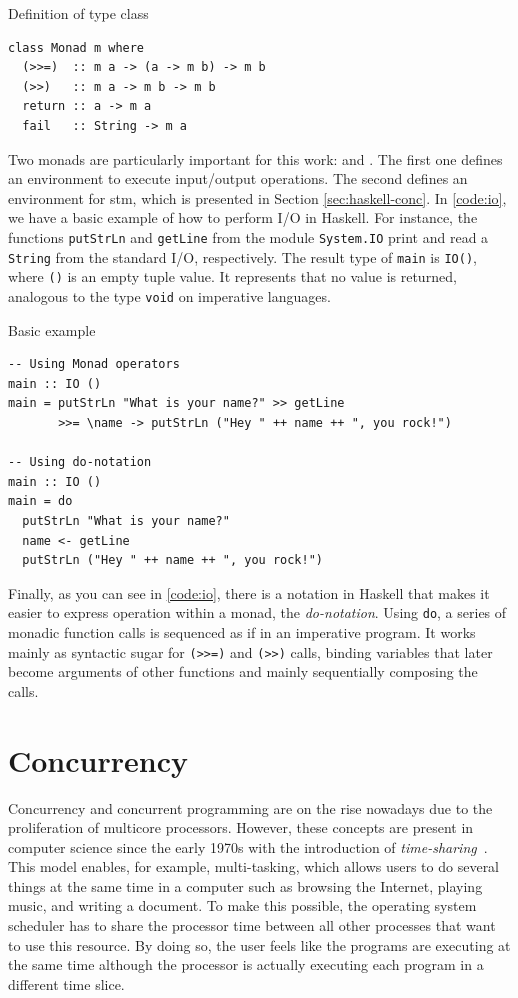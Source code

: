 \begin{listing}
  \caption{Definition of type class \Monad}
  \begin{verbatim}
class Monad m where
  (>>=)  :: m a -> (a -> m b) -> m b
  (>>)   :: m a -> m b -> m b
  return :: a -> m a
  fail   :: String -> m a
  \end{verbatim}
  \label{code:monad}
\end{listing}

Two monads are particularly important for this work: \IO and \STM. The first one defines an environment to execute input/output operations. The second defines an environment for \acl{stm}, which is presented in Section \ref{sec:haskell-conc}. In \autoref{code:io}, we have a basic example of how to perform I/O in Haskell. For instance, the functions \texttt{putStrLn} and \texttt{getLine} from the module \texttt{System.IO} print and read a \texttt{String} from the standard I/O, respectively. The result type of \texttt{main} is \texttt{IO()}, where \texttt{()} is an empty tuple value. It represents that no value is returned, analogous to the type \texttt{void} on imperative languages.

\begin{listing}
  \caption{Basic \IO example}
  \begin{verbatim}
-- Using Monad operators
main :: IO ()
main = putStrLn "What is your name?" >> getLine
       >>= \name -> putStrLn ("Hey " ++ name ++ ", you rock!")

-- Using do-notation
main :: IO ()
main = do
  putStrLn "What is your name?"
  name <- getLine
  putStrLn ("Hey " ++ name ++ ", you rock!")
  \end{verbatim}
  \label{code:io}
\end{listing}

Finally, as you can see in \autoref{code:io}, there is a notation in Haskell that makes it easier to express operation within a monad, the \emph{do-notation}. Using \texttt{do}, a series of monadic function calls is sequenced as if in an imperative program. It works mainly as syntactic sugar for \texttt{(>{}>=)} and \texttt{(>{}>)} calls, binding variables that later become arguments of other functions and mainly sequentially composing the calls.


\section{Concurrency}\label{sec:conc}
Concurrency and concurrent programming are on the rise nowadays due to the proliferation of multicore processors. However, these concepts are present in computer science since the early 1970s with the introduction of \emph{time-sharing}~\cite{lea:2006}. This model enables, for example, multi-tasking, which allows users to do several things at the same time in a computer such as browsing the Internet, playing music, and writing a document. To make this possible, the operating system scheduler has to share the processor time between all other processes that want to use this resource. By doing so, the user feels like the programs are executing at the same time although the processor is actually executing each program in a different time slice.

